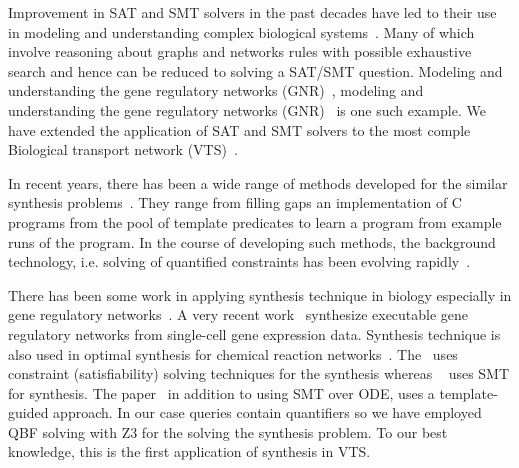 Improvement in SAT and SMT solvers in the past decades have led to their use in modeling and understanding complex biological systems~\cite{heule2010exact,yordanov2013smt,mangla2010timing}. 
%
Many of which involve reasoning about graphs and networks rules with possible exhaustive search and hence can be reduced to solving a SAT/SMT question. 
%
Modeling and understanding the gene regulatory networks (GNR)~\cite{guerra2012reasoning,chin2008biographe}, modeling and understanding the gene regulatory networks (GNR)~\cite{giacobbe2015model,rosenblueth2014inference, batt2010efficient, yordanov2016method, dunn2014defining, paoletti2014analyzing, koksal2013synthesis} is one such example. 
%
We have extended the application of SAT and SMT solvers to the most comple Biological transport network (VTS)~\cite{mani2016stacking,shukla}. 

In recent years, there has been a wide range of methods
developed for the similar synthesis problems~\cite{sketch,sygus,exampleSynth}.
%
They range from filling gaps an implementation of C programs from the pool of template predicates to learn a program from example
runs of the program.
%
In the course of developing such methods,
the background technology, i.e. solving of quantified
constraints has been evolving rapidly~\cite{lonsing2010depqbf,z3Quant}.
%

There has been some work in
applying synthesis technique in biology especially in gene regulatory networks~\cite{shavit2016automated, fisher2015synthesising}. A very recent work~\cite{fisher2015synthesising} synthesize executable gene regulatory networks from single-cell gene expression data.
Synthesis technique is also used in optimal synthesis for chemical reaction networks~\cite{cardelli2017syntax}. The~\cite{fisher2015synthesising} uses constraint (satisfiability) solving techniques for the synthesis whereas ~\cite{shavit2016automated} uses SMT for synthesis. The paper~\cite{cardelli2017syntax} in addition to using SMT over ODE, uses a template-guided approach. In our case queries contain quantifiers so we have employed QBF solving with Z3 for the solving the synthesis problem. To our best knowledge, this is the first application of synthesis in VTS.

~        
